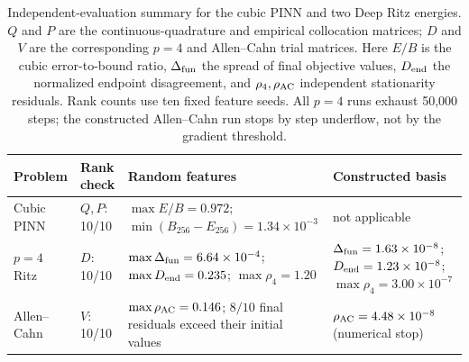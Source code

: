 \begin{table}[t]
\centering
\small
\setlength{\tabcolsep}{4pt}
\renewcommand{\arraystretch}{1.15}
\begin{tabular}{@{}p{}p{}p{}p{}@{}}
\hline
Problem & Rank check & Random features & Constructed basis \\
\hline
Cubic PINN & $Q,P$: 10/10 & $\max E/B=0.972$; $\min(B_{256}-E_{256})=1.34\times10^{-3}$ & not applicable \\
$p=4$ Ritz & $D$: 10/10 & $\max\Delta_{\rm fun}=6.64\times10^{-4}$; $\max D_{\rm end}=0.235$; $\max\rho_4=1.20$ & $\Delta_{\rm fun}=1.63\times10^{-8}$; $D_{\rm end}=1.23\times10^{-8}$; $\max\rho_4=3.00\times10^{-7}$ \\
Allen--Cahn & $V$: 10/10 & $\max\rho_{\rm AC}=0.146$; $8/10$ final residuals exceed their initial values & $\rho_{\rm AC}=4.48\times10^{-8}$ (numerical stop) \\
\hline
\end{tabular}
\caption{Independent-evaluation summary for the cubic PINN and two Deep Ritz energies.  $Q$ and $P$ are the continuous-quadrature and empirical collocation matrices; $D$ and $V$ are the corresponding $p=4$ and Allen--Cahn trial matrices.  Here $E/B$ is the cubic error-to-bound ratio, $\Delta_{\rm fun}$ the spread of final objective values, $D_{\rm end}$ the normalized endpoint disagreement, and $\rho_4,\rho_{\rm AC}$ independent stationarity residuals.  Rank counts use ten fixed feature seeds.  All $p=4$ runs exhaust 50,000 steps; the constructed Allen--Cahn run stops by step underflow, not by the gradient threshold.}
\label{tab:experiment2}
\end{table}
